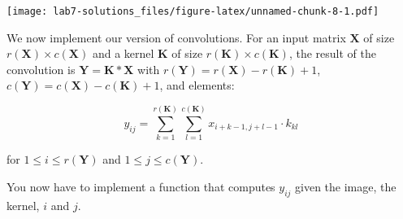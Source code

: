 \documentclass[
  a4paper,
]{article}
\begin{document}
\texttt{[image: lab7-solutions\_files/figure-latex/unnamed-chunk-8-1.pdf]}

We now implement our version of convolutions. For an input matrix
\(\textbf{X}\) of size \(r(\textbf{X})\times c(\textbf{X})\) and a
kernel \(\textbf{K}\) of size \(r(\textbf{K})\times c(\textbf{K})\), the
result of the convolution is \(\textbf{Y}=\textbf{K}*\textbf{X}\) with
\(r(\textbf{Y})=r(\textbf{X})-r(\textbf{K})+1\),
\(c(\textbf{Y})=c(\textbf{X})-c(\textbf{K})+1\), and elements:

\begin{equation}
y_{ij}=\sum_{k=1}^{r(\textbf{K})}\sum_{l=1}^{c(\textbf{K})}x_{i+k-1,j+l-1}\cdot k_{kl}
\end{equation}

for \(1\leq i \leq r(\textbf{Y})\) and \(1\leq j \leq c(\textbf{Y})\).

You now have to implement a function that computes \(y_{ij}\) given the
image, the kernel, \(i\) and \(j\).
\end{document}
